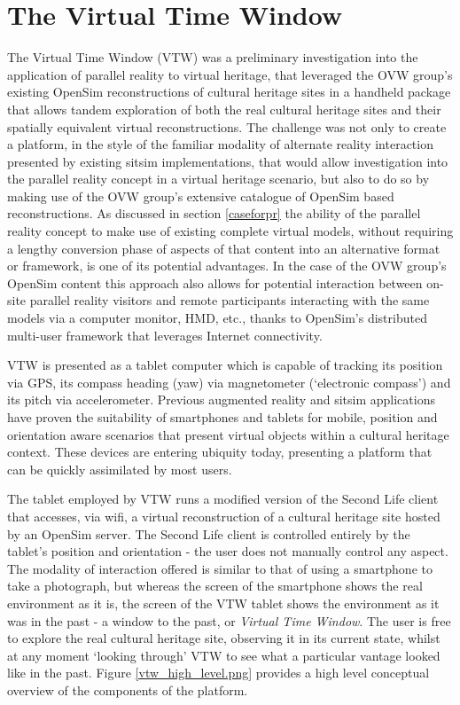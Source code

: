 \section{The Virtual Time Window}
\label{the-virtual-time-window}
The Virtual Time Window (VTW) was a preliminary investigation into the application of parallel reality to virtual heritage, that leveraged the OVW group's existing OpenSim reconstructions of cultural heritage sites in a handheld package that allows tandem exploration of both the real cultural heritage sites and their spatially equivalent virtual reconstructions. The challenge was not only to create a platform, in the style of the familiar modality of alternate reality interaction presented by existing sitsim implementations, that would allow investigation into the parallel reality concept in a virtual heritage scenario, but also to do so by making use of the OVW group's extensive catalogue of OpenSim based reconstructions. As discussed in section \ref{caseforpr} the ability of the parallel reality concept to make use of existing complete virtual models, without requiring a lengthy conversion phase of aspects of that content into an alternative format or framework, is one of its potential advantages. In the case of the OVW group's OpenSim content this approach also allows for potential interaction between on-site parallel reality visitors and remote participants interacting with the same models via a computer monitor, HMD, etc., thanks to OpenSim's distributed multi-user framework that leverages Internet connectivity.

VTW is presented as a tablet computer which is capable of tracking its position via GPS, its compass heading (yaw) via magnetometer (`electronic compass') and its pitch via accelerometer. Previous augmented reality and sitsim applications have proven the suitability of smartphones and tablets for mobile, position and orientation aware scenarios that present virtual objects within a cultural heritage context. These devices are entering ubiquity today, presenting a platform that can be quickly assimilated by most users.

The tablet employed by VTW runs a modified version of the Second Life client that accesses, via wifi, a virtual reconstruction of a cultural heritage site hosted by an OpenSim server. The Second Life client is controlled entirely by the tablet's position and orientation - the user does not manually control any aspect. The modality of interaction offered is similar to that of using a smartphone to take a photograph, but whereas the screen of the smartphone shows the real environment as it is, the screen of the VTW tablet shows the environment as it was in the past - a window to the past, or \textit{Virtual Time Window}. The user is free to explore the real cultural heritage site, observing it in its current state, whilst at any moment `looking through' VTW to see what a particular vantage looked like in the past. Figure \ref{vtw_high_level.png} provides a high level conceptual overview of the components of the platform.


